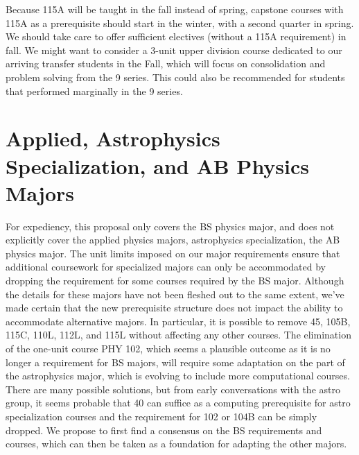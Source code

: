 \documentclass[12pt]{article}
\begin{document}
Because 115A will be taught in the fall instead of spring, capstone courses with 115A as a prerequisite should start in the winter, with a second quarter in spring.  We should take care to offer sufficient electives (without a 115A requirement) in fall.  We might want to consider a 3-unit upper division course dedicated to our arriving transfer students in the Fall, which will focus on consolidation and problem solving from the 9 series.  This could also be recommended for students that performed marginally in the 9 series.

\section{Applied, Astrophysics Specialization, and AB Physics Majors }

For expediency, this proposal only covers the BS physics major, and does not explicitly cover the applied physics majors, astrophysics specialization, the AB physics major.  The unit limits imposed on our major requirements ensure that additional coursework for specialized majors can only be accommodated by dropping the requirement for some courses required by the BS major.  Although the details for these majors have not been fleshed out to the same extent, we've made certain that the new prerequisite structure does not impact the ability to accommodate alternative majors.  In particular, it is possible to remove 45, 105B, 115C, 110L, 112L, and 115L without affecting any other courses.  The elimination of the one-unit course PHY 102, which seems a plausible outcome as it is no longer a requirement for BS majors, will require some adaptation on the part of the astrophysics major, which is evolving to include more computational courses.  There are many possible solutions, but from early conversations with the astro group, it seems probable that 40 can suffice as a computing prerequisite for astro specialization courses and the requirement for 102 or 104B can be simply dropped.  We propose to first find a consensus on the BS requirements and courses, which can then be taken as a foundation for adapting the other majors.
\end{document}
